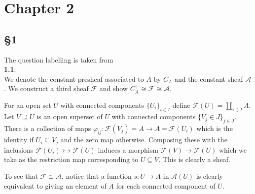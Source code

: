 \documentclass[12pt]{article}
\numberwithin{thm}{subsection}
\numberwithin{defn}{subsection}
\numberwithin{lemma}{subsection}
\numberwithin{example}{subsection}
\numberwithin{notation}{subsection}
\numberwithin{cor}{subsection}
\numberwithin{remark}{subsection}
\numberwithin{condition}{subsection}
\numberwithin{question}{subsection}
\numberwithin{construction}{subsection}
\numberwithin{construction}{subsection}
\numberwithin{construction}{subsection}
\newcommand{\scr}[1]{\mathscr{#1}}
\begin{document}
\section{Chapter 2}
\subsection{\S 1}
The question labelling is taken from \cite[II \S 1]{hartshorne}\\
\textbf{1.1}:\\
%
We denote the constant presheaf associated to $A$ by $C_A$ and the constant sheaf $\scr{A}$. We construct a third sheaf $\scr{F}$ and show $C_A^+ \cong \scr{F} \cong \scr{A}$.

For an open set $U$ with connected components $\lbrace U_i \rbrace_{i \in I}$ define $\scr{F}(U) = \coprod_{i \in I}A$. Let $V \supseteq U$ is an open superset of $U$ with connected components $\lbrace V_j \in J\rbrace_{j \in J}$. There is a collection of maps $\varphi_{ij}: \scr{F}(V_j) = A \to A = \scr{F}(U_i)$ which is the identity if $U_i \subseteq V_j$ and the zero map otherwise. Composing these with the inclusions $\scr{F}(U_i) \rightarrowtail \scr{F}(U)$ induces a morphism $\scr{F}(V) \to \scr{F}(U)$ which we take as the restriction map corresponding to $U \subseteq V$. This is clearly a sheaf.

To see that $\scr{F} \cong \scr{A}$, notice that a function $s: U \to A$ in $\scr{A}(U)$ is clearly equivalent to giving an element of $A$ for each connected component of $U$.
\end{document}
